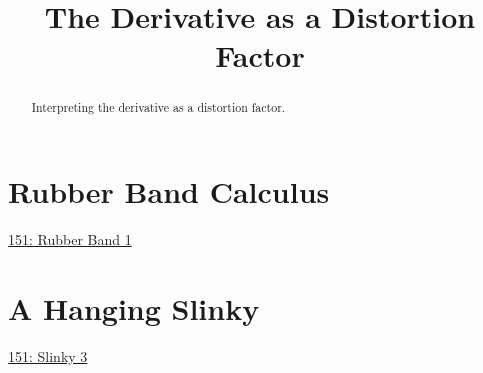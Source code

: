 \documentclass{ximera}
\title{The Derivative as a Distortion Factor}
\begin{document}
\begin{abstract}
Interpreting the derivative as a distortion factor.
\end{abstract}
\maketitle

\section{Rubber Band Calculus}

\begin{onlineOnly}
    \begin{center}
\end{center}
\end{onlineOnly}

\href{https://www.desmos.com/calculator/qejivz36ui}{151: Rubber Band 1}


\section{A Hanging Slinky}

\begin{onlineOnly}
    \begin{center}
\end{center}
\end{onlineOnly}

\href{https://www.desmos.com/calculator/x4prb8mvuj}{151: Slinky 3}
\end{document}
